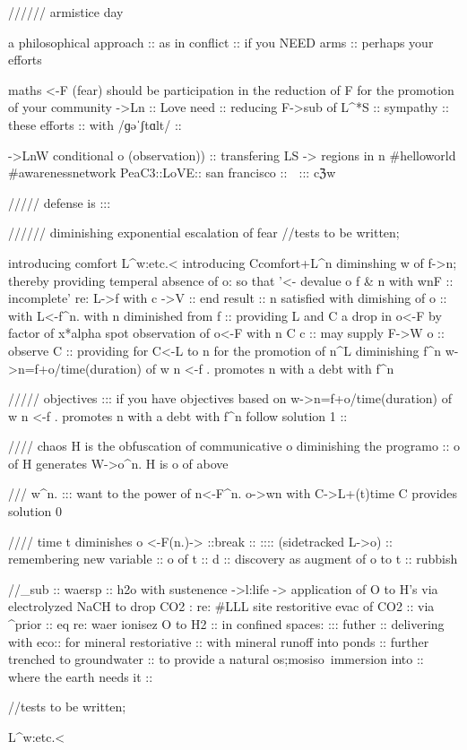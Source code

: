 //////
armistice day

a philosophical approach :: as in conflict :: if you NEED arms :: perhaps your efforts {maths{ <-F (fear)} should be participation in the reduction of {F} for the promotion of your community {->Ln :: Love need} :: reducing {F->sub of L^*S :: sympathy} :: these efforts :: with /ɡəˈʃtɑlt/ :: {->LnW conditional o (observation)) :: transfering {LS -> regions in n} #helloworld #awarenessnetwork PeaC3::LoVE:: san francisco :: 🌿 ::: cℨw 


/////
defense is :::

////// {diminishing exponential escalation of fear}
//tests to be written;

{introducing comfort}
L^{w:etc}.<
introducing C{comfort}+L^n diminshing w of f->n; thereby providing temperal absence of o:
so that '<- devalue o f & n with wnF :: {incomplete}' re: L->f with c ->V ::
end result :: n satisfied with dimishing of o :: with L<-f^n. with n diminished from f :: 
providing L and C a drop in o<-F by factor of x*{alpha}
spot observation of o<-F with n C c :: may supply F->W o :: 
observe C :: providing for C<-L to n for the promotion of n^L diminishing f^n {w->n=f+o/time(duration) of w n <-f . promotes n with a debt with f^n}


/////
objectives ::: 
if you have objectives based on {w->n=f+o/time(duration) of w n <-f . promotes n with a debt with f^n}
follow {solution 1} :: 


//// chaos
H is the obfuscation of communicative o diminishing the program{o} ::
o of H generates W->o^n. H is o of {above}

/// w^n. ::: want to the power of n<-F^n.
o->wn with C->L+(t){time} C provides {solution 0}

//// time
t diminishes o <-F(n.)-> ::break :: 
:::: (sidetracked L->o) :: remembering new variable :: o of t :: 
d :: discovery as augment of o to t :: {rubbish}}


//_sub :: waer{sp} :: h2o with sustenence ->{l:life} -> 
application of O to H's via electrolyzed NaCH to drop CO2 : re: #LLL {site}
restoritive evac of CO2 :: via ^prior :: {eq} re: {waer} ionisez O to H2 :: in confined spaces:
::: futher :: delivering with eco:: for mineral restoriative :: with mineral runoff into ponds :: further trenched to groundwater :: to provide a natural {os;mosis}o\ immersion into :: where the earth needs it ::


//tests to be written;

L^{w:etc}.<

}
